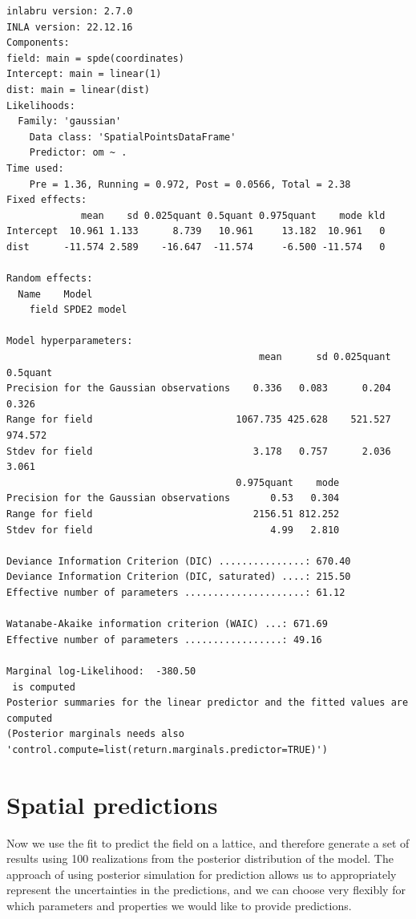 \documentclass[
  a4paper,
]{article}
\begin{document}
\begin{verbatim}
inlabru version: 2.7.0
INLA version: 22.12.16
Components:
field: main = spde(coordinates)
Intercept: main = linear(1)
dist: main = linear(dist)
Likelihoods:
  Family: 'gaussian'
    Data class: 'SpatialPointsDataFrame'
    Predictor: om ~ .
Time used:
    Pre = 1.36, Running = 0.972, Post = 0.0566, Total = 2.38 
Fixed effects:
             mean    sd 0.025quant 0.5quant 0.975quant    mode kld
Intercept  10.961 1.133      8.739   10.961     13.182  10.961   0
dist      -11.574 2.589    -16.647  -11.574     -6.500 -11.574   0

Random effects:
  Name    Model
    field SPDE2 model

Model hyperparameters:
                                            mean      sd 0.025quant 0.5quant
Precision for the Gaussian observations    0.336   0.083      0.204    0.326
Range for field                         1067.735 425.628    521.527  974.572
Stdev for field                            3.178   0.757      2.036    3.061
                                        0.975quant    mode
Precision for the Gaussian observations       0.53   0.304
Range for field                            2156.51 812.252
Stdev for field                               4.99   2.810

Deviance Information Criterion (DIC) ...............: 670.40
Deviance Information Criterion (DIC, saturated) ....: 215.50
Effective number of parameters .....................: 61.12

Watanabe-Akaike information criterion (WAIC) ...: 671.69
Effective number of parameters .................: 49.16

Marginal log-Likelihood:  -380.50 
 is computed 
Posterior summaries for the linear predictor and the fitted values are computed
(Posterior marginals needs also 'control.compute=list(return.marginals.predictor=TRUE)')
\end{verbatim}

\hypertarget{spatial-predictions}{%
\section{Spatial predictions}\label{spatial-predictions}}

Now we use the fit to predict the field on a lattice, and therefore
generate a set of results using 100 realizations from the posterior
distribution of the model. The approach of using posterior simulation
for prediction allows us to appropriately represent the uncertainties in
the predictions, and we can choose very flexibly for which parameters
and properties we would like to provide predictions.
\end{document}
